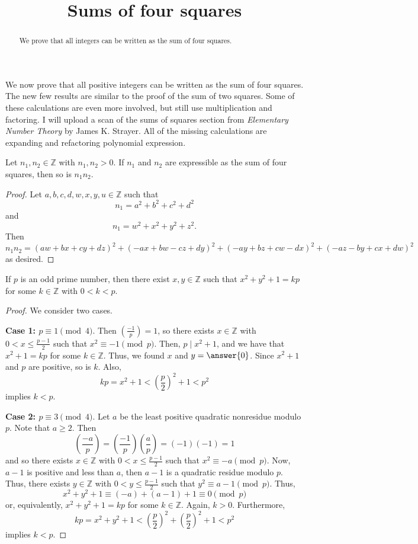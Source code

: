 \documentclass{ximera}
\title{Sums of four squares}
\begin{document}
  
\begin{abstract}  We prove that all integers can be written as the sum of four squares.
\end{abstract}
\maketitle  

We now prove that all positive integers can be written as the sum of four squares. The new few results are similar to the proof of the sum of two squares. Some of these calculations are even more involved, but still use multiplication and factoring. I will upload a scan of the sums of squares section from \emph{Elementary Number Theory} by James K. Strayer. All of the missing calculations are expanding and refactoring polynomial expression. 

\begin{theorem}[Euler]
 Let $n_1,n_2\in\mathbb{Z}$ with $n_1,n_2>0$. If $n_1$ and $n_2$ are expressible as the sum of four squares, then so is $n_1n_2$. 
\end{theorem}
\begin{proof}
 Let $a,b,c,d,w,x,y,u\in\mathbb{Z}$ such that \[n_1=a^2+b^2+c^2+d^2\] and \[n_1=w^2+x^2+y^2+z^2.\]  Then \[n_1n_2=(aw+bx+cy+dz)^2+(-ax+bw-cz+dy)^2+(-ay+bz+cw-dx)^2+(-az-by+cx+dw)^2 \] as desired.
\end{proof}

\begin{theorem}
 If $p$ is an odd prime number, then there exist $x,y\in\mathbb{Z}$ such that $x^2+y^2+1=kp$ for some $k\in\mathbb{Z}$ with $0<k<p$.
\end{theorem}
\begin{proof}
 We consider two cases.
 
{\bf Case 1: $p\equiv 1\pmod 4$}. Then $\left(\frac{-1}{p}\right)=1$, so there exists $x\in\mathbb{Z}$ with $0<x\leq\frac{p-1}{2}$ such that $x^2\equiv -1 \pmod p$. Then, $p\mid x^2+1$, and we have that $x^2+1=kp$ for some $k\in\mathbb{Z}$. Thus, we found $x$ and $y=\answer{0}$. Since $x^2+1$ and $p$ are positive, so is $k$. Also, \[kp=x^2+1<\left(\frac{p}{2}\right)^2+1<p^2\] implies $k<p$.

{\bf Case 2: $p\equiv 3\pmod 4$}. Let $a$ be the least positive quadratic nonresidue modulo $p$. Note that $a\geq2$. Then \[\left(\frac{-a}{p}\right)=\left(\frac{-1}{p}\right)\left(\frac{a}{p}\right)=(-1)(-1)=1\] and so there exists $x\in\mathbb{Z}$ with $0<x\leq\frac{p-1}{2}$ such that $x^2\equiv -a \pmod p$. Now, $a-1$ is positive and less than $a$, then $a-1$ is a quadratic residue modulo $p$. Thus, there exists $y\in\mathbb{Z}$ with $0<y\leq\frac{p-1}{2}$ such that $y^2\equiv a-1 \pmod p$. Thus, \[x^2+y^2+1\equiv (-a)+(a-1)+1\equiv 0 \pmod p\] or, equivalently, $x^2+y^2+1=kp$ for some $k\in\mathbb{Z}$. Again, $k>0$. Furthermore, \[kp=x^2+y^2+1<\left(\frac{p}{2}\right)^2+\left(\frac{p}{2}\right)^2+1<p^2\] implies $k<p$. \qedhere
\end{proof}
\end{document}
